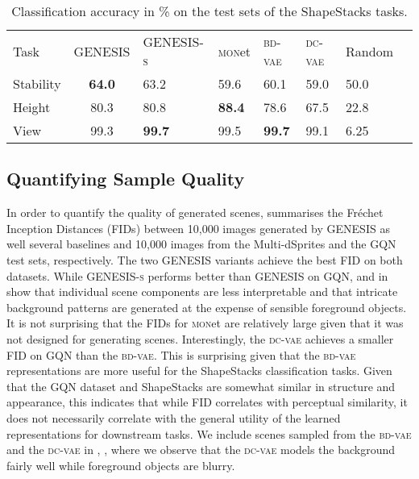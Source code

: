 \documentclass{article}
\begin{document}
\begin{table}[h!]
    \centering
    \caption{Classification accuracy in \% on the test sets of the ShapeStacks tasks.}
    \label{tab:semisupervised}
    \begin{tabularx}{0.85\textwidth}{l c*{6}{Y}}
        \toprule
        Task & \gls{GENESIS} & \mbox{\gls{GENESIS}\textsc{-s}} & \textsc{mon}et & \textsc{bd-vae} & \textsc{dc-vae} & Random \\
        \cmidrule(r){1-1} \cmidrule(rl){2-4} \cmidrule(rl){5-6} \cmidrule(r){7-7}
        Stability & \textbf{64.0} & 63.2          & 59.6          & 60.1          & 59.0 & 50.0 \\
        Height    & 80.3          & 80.8          & \textbf{88.4} & 78.6          & 67.5 & 22.8 \\
        View      & 99.3          & \textbf{99.7} & 99.5          & \textbf{99.7} & 99.1 & 6.25 \\
        \bottomrule
    \end{tabularx}
\end{table}






\subsection{Quantifying Sample Quality}
\label{sec:vae}

In order to quantify the quality of generated scenes,  summarises the Fr\'{e}chet Inception Distances (FIDs) \citep{heusel2017gans} between 10,000 images generated by \gls{GENESIS} as well several baselines and 10,000 images from the Multi-dSprites and the GQN test sets, respectively.
The two \gls{GENESIS} variants achieve the best FID on both datasets.
While \gls{GENESIS}\textsc{-s} performs better than \gls{GENESIS} on GQN,  and  in  show that individual scene components are less interpretable and that intricate background patterns are generated at the expense of sensible foreground objects.
It is not surprising that the FIDs for \textsc{mon}et are relatively large given that it was not designed for generating scenes.
Interestingly, the \textsc{dc-vae} achieves a smaller FID on GQN than the \textsc{bd-vae}.
This is surprising given that the \textsc{bd-vae} representations are more useful for the ShapeStacks classification tasks.
Given that the GQN dataset and ShapeStacks are somewhat similar in structure and appearance, this indicates that while FID correlates with perceptual similarity, it does not necessarily correlate with the general utility of the learned representations for downstream tasks.
We include scenes sampled from the \textsc{bd-vae} and the \textsc{dc-vae} in , , where we observe that the \textsc{dc-vae} models the background fairly well while foreground objects are blurry.
\end{document}
